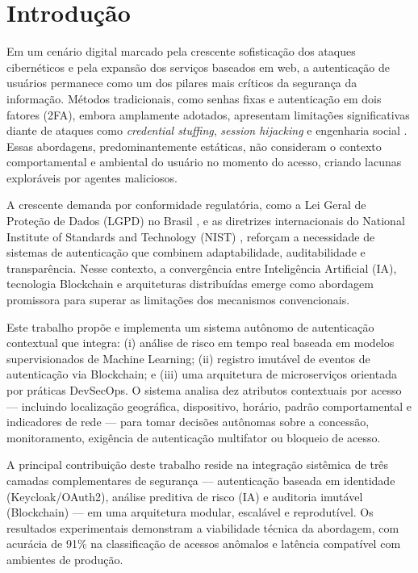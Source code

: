 \documentclass[12pt]{article}
\begin{document}
\section{Introdução}

Em um cenário digital marcado pela crescente sofisticação dos ataques cibernéticos e pela expansão dos serviços baseados em web, a autenticação de usuários permanece como um dos pilares mais críticos da segurança da informação. Métodos tradicionais, como senhas fixas e autenticação em dois fatores (2FA), embora amplamente adotados, apresentam limitações significativas diante de ataques como \textit{credential stuffing}, \textit{session hijacking} e engenharia social \cite{owasp2023}. Essas abordagens, predominantemente estáticas, não consideram o contexto comportamental e ambiental do usuário no momento do acesso, criando lacunas exploráveis por agentes maliciosos.

A crescente demanda por conformidade regulatória, como a Lei Geral de Proteção de Dados (LGPD) no Brasil \cite{brasil2018}, e as diretrizes internacionais do National Institute of Standards and Technology (NIST) \cite{nist2020}, reforçam a necessidade de sistemas de autenticação que combinem adaptabilidade, auditabilidade e transparência. Nesse contexto, a convergência entre Inteligência Artificial (IA), tecnologia Blockchain e arquiteturas distribuídas emerge como abordagem promissora para superar as limitações dos mecanismos convencionais.

Este trabalho propõe e implementa um sistema autônomo de autenticação contextual que integra: (i) análise de risco em tempo real baseada em modelos supervisionados de Machine Learning; (ii) registro imutável de eventos de autenticação via Blockchain; e (iii) uma arquitetura de microserviços orientada por práticas DevSecOps. O sistema analisa dez atributos contextuais por acesso --- incluindo localização geográfica, dispositivo, horário, padrão comportamental e indicadores de rede --- para tomar decisões autônomas sobre a concessão, monitoramento, exigência de autenticação multifator ou bloqueio de acesso.

A principal contribuição deste trabalho reside na integração sistêmica de três camadas complementares de segurança --- autenticação baseada em identidade (Keycloak/OAuth2), análise preditiva de risco (IA) e auditoria imutável (Blockchain) --- em uma arquitetura modular, escalável e reprodutível. Os resultados experimentais demonstram a viabilidade técnica da abordagem, com acurácia de 91\% na classificação de acessos anômalos e latência compatível com ambientes de produção.
\end{document}
